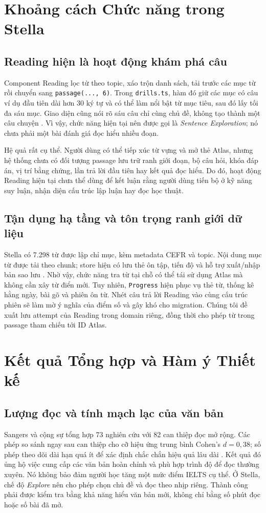 \documentclass[conference,10pt]{IEEEtran}
\begin{document}
\section{Khoảng cách Chức năng trong Stella}
\subsection{Reading hiện là hoạt động khám phá câu}
Component Reading lọc từ theo topic, xáo trộn danh sách, tải trước các mục từ rồi chuyển sang \texttt{passage(..., 6)}. Trong \texttt{drills.ts}, hàm đó giữ các mục có câu ví dụ đầu tiên dài hơn 30 ký tự và có thể làm nổi bật từ mục tiêu, sau đó lấy tối đa sáu mục. Giao diện cũng nói rõ sáu câu chỉ cùng chủ đề, không tạo thành một câu chuyện \cite{stellarepo}. Vì vậy, chức năng hiện tại nên được gọi là \emph{Sentence Exploration}; nó chưa phải một bài đánh giá đọc hiểu nhiều đoạn.

Hệ quả rất cụ thể. Người dùng có thể tiếp xúc từ vựng và mở thẻ Atlas, nhưng hệ thống chưa có đối tượng passage lưu trữ ranh giới đoạn, bộ câu hỏi, khóa đáp án, vị trí bằng chứng, lần trả lời đầu tiên hay kết quả đọc hiểu. Do đó, hoạt động Reading hiện tại chưa thể dùng để kết luận rằng người dùng tiến bộ ở kỹ năng suy luận, nhận diện cấu trúc lập luận hay đọc học thuật.

\subsection{Tận dụng hạ tầng và tôn trọng ranh giới dữ liệu}
Stella có 7.298 từ được lập chỉ mục, kèm metadata CEFR và topic. Nội dung mục từ được tải theo chunk; store hiện có lưu thẻ ôn tập, tiến độ và hỗ trợ xuất/nhập bản sao lưu \cite{stellarepo}. Nhờ vậy, chức năng tra từ tại chỗ có thể tái sử dụng Atlas mà không cần xây từ điển mới. Tuy nhiên, \texttt{Progress} hiện phục vụ thẻ từ, thống kê hằng ngày, bài gõ và phiên ôn từ. Nhét câu trả lời Reading vào cùng cấu trúc phiên sẽ làm mờ ý nghĩa của điểm số và gây khó cho migration. Chúng tôi đề xuất lưu attempt của Reading trong domain riêng, đồng thời cho phép từ trong passage tham chiếu tới ID Atlas.

\section{Kết quả Tổng hợp và Hàm ý Thiết kế}
\subsection{Lượng đọc và tính mạch lạc của văn bản}
Sangers và cộng sự tổng hợp 73 nghiên cứu với 82 can thiệp đọc mở rộng. Các phép so sánh ngay sau can thiệp cho cỡ hiệu ứng trung bình Cohen's $d=0{,}38$; số phép theo dõi dài hạn quá ít để xác định chắc chắn hiệu quả lâu dài \cite{sangers2025}. Kết quả đó ủng hộ việc cung cấp các văn bản hoàn chỉnh và phù hợp trình độ để đọc thường xuyên. Nó không bảo đảm người học tăng một mức điểm IELTS cụ thể. Ở Stella, chế độ \emph{Explore} nên cho phép chọn chủ đề và đọc theo nhịp riêng. Thành công phải được kiểm tra bằng khả năng hiểu văn bản mới, không chỉ bằng số phút đọc hoặc số bài đã mở.
\end{document}
